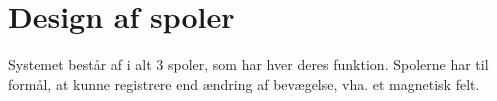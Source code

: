 \section{Design af spoler}\label{sec:sec_spole_design}
Systemet består af i alt 3 spoler, som har hver deres funktion. Spolerne har til formål, at kunne registrere end ændring af bevægelse, vha. et magnetisk felt.